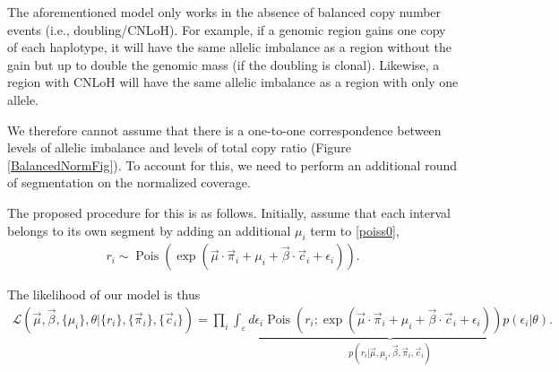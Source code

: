 \documentclass[10pt,letter]{article}
\numberwithin{equation}{section}
\newcommand{\textop}[1]{\operatorname{#1}}
\begin{document}
The aforementioned model only works in the absence of balanced copy number events (i.e., doubling/CNLoH). For example, if a genomic region gains one copy of each haplotype, it will have the same allelic imbalance as a region without the gain but up to double the genomic mass (if the doubling is clonal). Likewise, a region with CNLoH will have the same allelic imbalance as a region with only one allele.

We therefore cannot assume that there is a one-to-one correspondence between levels of allelic imbalance and levels of total copy ratio (Figure \ref{BalancedNormFig}). To account for this, we need to perform an additional round of segmentation on the normalized coverage.

The proposed procedure for this is as follows. Initially, assume that each interval belongs to its own segment by adding an additional $\mu_i$ term to \eqref{poiss0},
\begin{align*}
r_i \sim \textop{Pois}(\exp(\vec\mu\cdot\vec \pi_i + \mu_i + \vec\beta\cdot\vec c_i + \epsilon_i)).
\end{align*}

The likelihood of our model is thus
\begin{align*}
\mathcal{L}(\vec \mu,\vec\beta,\{\mu_i\},\theta|\{r_i\},\{\vec \pi_i\},\{\vec c_i\}) = \prod_i \underbrace{\int_{\varepsilon} d\epsilon_i \textop{Pois}(r_i;\exp(\vec\mu\cdot\vec \pi_i + \mu_i + \vec\beta\cdot\vec c_i + \epsilon_i))p(\epsilon_i|\theta)}_{p(r_i|\vec\mu,\mu_i,\vec \beta,\vec \pi_i, \vec c_i)}.
\end{align*}
\end{document}
